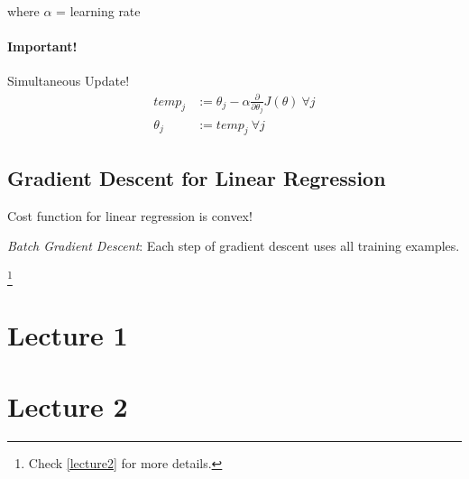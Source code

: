 \documentclass[a4paper, 12pt]{report}
\newcommand\blfootnote[1]{
	\begingroup
	\renewcommand\thefootnote{}\footnote{#1}
	\addtocounter{footnote}{-1}
	\endgroup
}
\begin{document}
where $\alpha$ = learning rate

\subsubsection*{Important!}
Simultaneous Update!
\begin{align*}
	temp_j   & := \theta_j - \alpha\frac{\partial}{\partial\theta_j}J(\theta) \ \forall j \\
	\theta_j & := temp_j \ \forall j
\end{align*}

\section{Gradient Descent for Linear Regression}
Cost function for linear regression is convex!

\emph{Batch Gradient Descent}: Each step of gradient descent uses all training examples.

\blfootnote{Check \autoref{lecture2} for more details.}

\begin{appendices}
	\chapter{Lecture 1} \label{lecture1}
	
	\chapter{Lecture 2} \label{lecture2}
	
\end{appendices}
\end{document}
